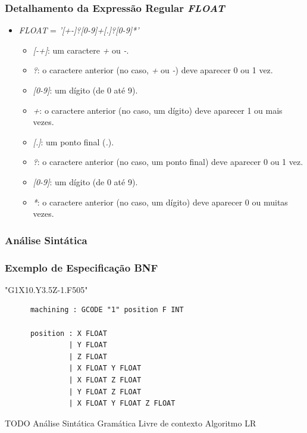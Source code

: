 \documentclass[aspectratio=169]{beamer}
\begin{document}
{  \begin{frame}
    \frametitle{Detalhamento da Expressão Regular \emph{FLOAT}}
    \begin{itemize}
      \item \emph{FLOAT} = \emph{'[+-]?[0-9]+[.]?[0-9]*'}
        \begin{itemize}
          \item \emph{[-+]}: um caractere \emph{+} ou \emph{-}.
          \item \emph{?}: o caractere anterior (no caso, \emph{+} ou \emph{-}) deve aparecer 0 ou 1 vez.
          \item \emph{[0-9]}: um dígito (de 0 até 9).
          \item \emph{+}: o caractere anterior (no caso, um dígito) deve aparecer 1 ou mais vezes.
          \item \emph{[.]}: um ponto final (\emph{.}).
          \item \emph{?}: o caractere anterior (no caso, um ponto final) deve aparecer 0 ou 1 vez.
          \item \emph{[0-9]}: um dígito (de 0 até 9).
          \item \emph{*}: o caractere anterior (no caso, um dígito) deve aparecer 0 ou muitas vezes.
      \end{itemize}
    \end{itemize}
\end{frame}


\begin{frame}
  \frametitle{Análise Sintática}

  

\end{frame}


\begin{frame}[fragile]
  \frametitle{Exemplo de Especificação BNF}
  \begin{example}
   "G1X10.Y3.5Z-1.F505"
    \begin{lstlisting}
      machining : GCODE "1" position F INT

      position : X FLOAT
               | Y FLOAT
               | Z FLOAT
               | X FLOAT Y FLOAT
               | X FLOAT Z FLOAT
               | Y FLOAT Z FLOAT
               | X FLOAT Y FLOAT Z FLOAT
    \end{lstlisting}
  \end{example}  
\end{frame}


TODO  
  Análise Sintática
  Gramática Livre de contexto
  Algoritmo LR



}
\end{document}
